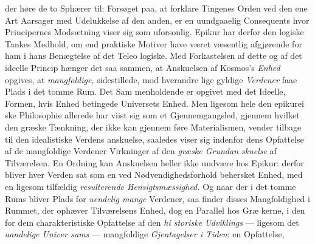 der høre de to Sphærer til: Forsøget paa, at forklare Tingenes
Orden ved den ene Art Aarsager med Udelukkelse af den
anden, er en uundgaaelig Consequents hvor Principernes
Modsætning viser sig som uforsonlig. Epikur har derfor den
logiske Tankes Medhold, om end praktiske Motiver have været
væsentlig afgjørende for ham i hans Benægtelse af det Teleo\-%
logiske. Med Forkastelsen af dette og af det ideelle Princip
hænger det saa sammen, at Anskuelsen af Kosmos's \emph{Enhed}
opgives, at \emph{mangfoldige,} sidestillede, mod hverandre lige\-%
gyldige \emph{Verdener} faae Plads i det tomme Rum. Det Sam\-%
menholdende er opgivet med det Ideelle, Formen, hvis Enhed
betingede Universets Enhed. Men ligesom hele den epikurei\-%
ske Philosophie allerede har viist sig som et Gjennemgangsled,
gjennem hvilket den græske Tænkning, der ikke kan gjennem\-%
føre Materialismen, vender tilbage til den idealistiske Verdens\-%
anskuelse, saaledes viser sig indenfor dens Opfattelse af de
mangfoldige Verdener Virkninger af den \emph{græske Grundan\-%
skuelse} af Tilværelsen. En Ordning kan Anskuelsen heller
ikke undvære hos Epikur: derfor bliver hver Verden sat som
en ved Nødvendighedsforhold behersket Enhed, med en ligesom
tilfældig \emph{resulterende Hensigtsmæssighed.} Og naar
der i det tomme Rums  bliver Plads for \emph{uendelig
mange} Verdener, saa finder disses Mangfoldighed i Rummet,
der ophæver Tilværelsens Enhed, dog en Parallel hos Græ\-%
kerne, i den for dem charakteristiske Opfattelse af den \emph{hi\-%
storiske Udviklings} --- ligesom det \emph{aandelige Univer\-%
sums} --- mangfoldige \emph{Gjentagelser i Tiden}: en Opfattelse,
 \setcounter{footnote}{0}
